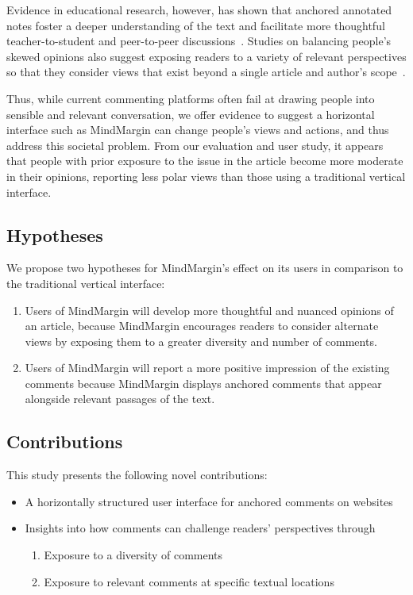 Evidence in educational research, however, has shown that anchored annotated notes foster a deeper understanding of the text and facilitate more thoughtful teacher-to-student and peer-to-peer discussions~\cite{AnnotationsStudents,NB}. Studies on balancing people’s skewed opinions also suggest exposing readers to a variety of relevant perspectives so that they consider views that exist beyond a single article and author’s scope~\cite{Politics,NewsCube,ConsiderIt}. 

Thus, while current commenting platforms often fail at drawing people into sensible and relevant conversation, we offer evidence to suggest a horizontal interface such as MindMargin can change people’s views and actions, and thus address this societal problem. From our evaluation and user study, it appears that people with prior exposure to the issue in the article become more moderate in their opinions, reporting less polar views than those using a traditional vertical interface.

\subsection{Hypotheses}
We propose two hypotheses for MindMargin's effect on its users in comparison to the traditional vertical interface:
\begin{enumerate}
\item Users of MindMargin will develop more thoughtful and nuanced opinions of an article, because MindMargin encourages readers to consider alternate views by exposing them to a greater diversity and number of comments.
\item Users of MindMargin will report a more positive impression of the existing comments because MindMargin displays anchored comments that appear alongside relevant passages of the text.
\end{enumerate}

\subsection{Contributions}
This study presents the following novel contributions:
\begin{itemize}
\item A horizontally structured user interface for anchored comments on websites
\item Insights into how comments can challenge readers' perspectives through
\begin{enumerate}
\item Exposure to a diversity of comments
\item Exposure to relevant comments at specific textual locations
\end{enumerate}
\end{itemize}

